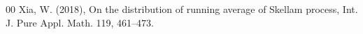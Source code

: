 \documentclass[12pt, twoside, english, headsepline]{article}
\theoremstyle{definition} %
\numberwithin{equation}{section} %
\begin{document}
{\begin{thebibliography}{00}
%
%
Xia, W. (2018), On the distribution of running average of Skellam process, Int. J. Pure Appl. Math. 119, 461--473.

\end{thebibliography}
}
\end{document}
